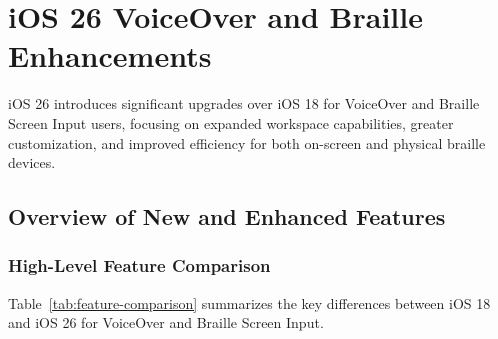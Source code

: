\chapter{iOS 26 VoiceOver and Braille Enhancements}

iOS 26 introduces significant upgrades over iOS 18 for VoiceOver and Braille Screen Input users, focusing on expanded workspace capabilities, greater customization, and improved efficiency for both on-screen and physical braille devices\supercite{nelowvision2025,myvision2025,applevisVO2024}.

\section{Overview of New and Enhanced Features}

\subsection{High-Level Feature Comparison}
Table~\ref{tab:feature-comparison} summarizes the key differences between iOS 18 and iOS 26 for VoiceOver and Braille Screen Input.

